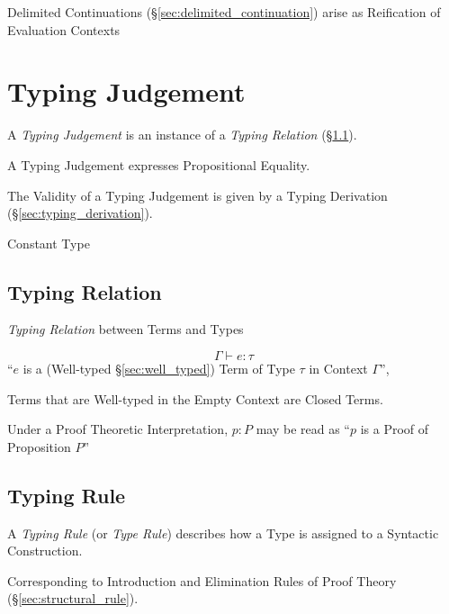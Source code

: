 Delimited Continuations (\S\ref{sec:delimited_continuation}) arise as
Reification of Evaluation Contexts



\section{Typing Judgement}\label{sec:typing_judgement}

A \emph{Typing Judgement} is an instance of a \emph{Typing Relation}
(\S\ref{sec:typing_relation}).

A Typing Judgement expresses Propositional Equality. %

The Validity of a Typing Judgement is given by a Typing Derivation
(\S\ref{sec:typing_derivation}).

Constant Type %



\subsection{Typing Relation}\label{sec:typing_relation}

\emph{Typing Relation} between Terms and Types

\[
  \Gamma \vdash e : \tau
\]
``$e$ is a (Well-typed \S\ref{sec:well_typed}) Term of Type $\tau$ in
Context $\Gamma$'',

Terms that are Well-typed in the Empty Context are Closed Terms.

Under a Proof Theoretic Interpretation, $p : P$ may be read as ``$p$
is a Proof of Proposition $P$''



\subsection{Typing Rule}\label{sec:typing_rule}

A \emph{Typing Rule} (or \emph{Type Rule}) describes how a Type is
assigned to a Syntactic Construction.

Corresponding to Introduction and Elimination Rules of Proof Theory
(\S\ref{sec:structural_rule}).

